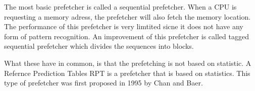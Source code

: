 The most basic prefetcher is called a sequential prefetcher. When a CPU is requesting a memory adress, the prefetcher will also fetch the memory location. The performance of this prefetcher is very limtited sicne it does not have any form of pattern recognition. An improvement of this prefetcher is called tagged sequential prefetcher which divides the sequences into blocks.

What these have in common, is that the prefetching is not based on statistic. A Refernce Prediction Tables RPT is a prefetcher that is based on statistics. This type of prefetcher was first proposed in 1995 by Chan and Baer.
